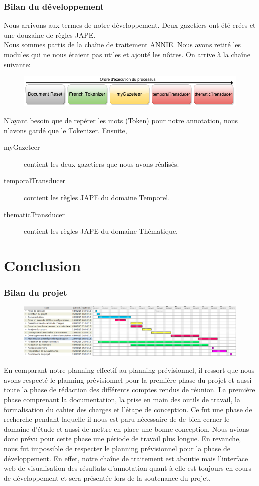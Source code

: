 \documentclass[a4paper, 11pt]{report}
\begin{document}
\section{Bilan du développement}
Nous arrivons aux termes de notre développement. Deux gazetiers ont été crées et une douzaine de règles JAPE.\\
Nous sommes partis de la chaîne de traitement ANNIE. Nous avons retiré les modules qui ne nous étaient pas utiles et ajouté les nôtres. On arrive à la chaîne suivante:
\begin{figure}[H]
\centering
\includegraphics[scale=.5]{img/notreChaine.png}
\end{figure}
N'ayant besoin que de repérer les mots (Token) pour notre annotation, nous n'avons gardé que le Tokenizer. Ensuite, 
\begin{description}
\item[myGazeteer] contient les deux gazetiers que nous avons réalisés.
\item[temporalTransducer] contient les règles JAPE du domaine Temporel.
\item[thematicTransducer] contient les règles JAPE du domaine Thématique.
\end{description}
\part{Conclusion}
\section{Bilan du projet}
\begin{figure}[hbtp]
\includegraphics[scale=.3]{img/ganttEff.png}
\end{figure}
En comparant notre planning effectif au planning prévisionnel, il ressort que nous avons respecté le planning prévisionnel pour la première phase du projet et aussi toute la phase de rédaction des différents comptes rendus de réunion. La première phase comprenant la documentation, la prise en main des outils de travail, la formalisation du cahier des charges et l'étape de conception. Ce fut une phase de recherche pendant laquelle il nous est paru nécessaire de de bien cerner le domaine d'étude et aussi de mettre en place une bonne conception. Nous avions donc prévu pour cette phase une période de travail plus longue. En revanche, nous fut impossible de respecter le planning prévisionnel pour la phase de développement. En effet, notre chaîne de traitement est aboutie mais l'interface web de visualisation des résultats d'annotation quant à elle est toujours en cours de développement et sera présentée lors de la soutenance du projet.
\end{document}
